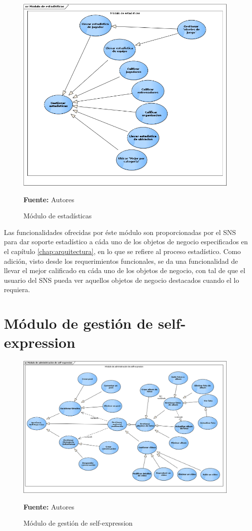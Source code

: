 \begin{figure}[!htb]
  \begin{center}
    \includegraphics[width=11cm]{./imagenes/casos_uso/gestion_estadisticas.png}
    \caption{Módulo de estadísticas}
    \label{fig:cu_estad}
    \textbf{Fuente:} Autores
  \end{center}
\end{figure}

Las funcionalidades ofrecidas por éste módulo son proporcionadas por el SNS para dar soporte estadístico a cáda uno de los objetos de negocio especificados en el capítulo \ref{chap:arquitectura}, en lo que se refiere al proceso estadístico. Como adición, visto desde los requerimientos funcionales, se da una funcionalidad de llevar el mejor calificado en cáda uno de los objetos de negocio, con tal de que el usuario del SNS pueda ver aquellos objetos de negocio destacados cuando el lo requiera.

\clearpage

\section{Módulo de gestión de self-expression}

\begin{figure}[!htb]
  \begin{center}
    \includegraphics[width=11cm]{./imagenes/casos_uso/gestion_self_sharing.png}
    \caption{Módulo de gestión de self-expression}
    \label{fig:cu_self_shar}
    \textbf{Fuente:} Autores
  \end{center}
\end{figure}

